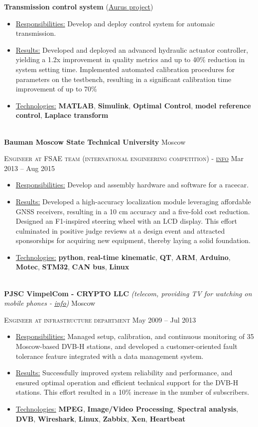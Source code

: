 \documentclass[12pt, a4paper]{extarticle}
\newcommand{\mymk}[1]{\textbf{#1}}
\newcommand{\placeheadding}[3]{\textbf{#1} \textit{#2} \hfill #3\null}
\newcommand{\positionheading}[2]{\par\noindent \textsc{#1} \hfill #2}
\newcommand{\ressubheading}[5]{\placeheadding{#1}{#2}{#3} \positionheading{#4}{#5}}
\newcommand{\horizontalline}{\par\noindent\\}
\begin{document}
\textbf{Transmission control system} (\href{https://en.wikipedia.org/wiki/Aurus_Senat}{Aurus project})
\begin{itemize}
	\item[] \underline{Responsibilities:} Develop and deploy control system for automaic transmission.
	\item[] \underline{Results:} Developed and deployed an advanced hydraulic actuator controller, yielding a 1.2x improvement in quality metrics and up to 40\% reduction in system setting time. Implemented automated calibration procedures for parameters on the testbench, resulting in a significant calibration time improvement of up to 70\%
	\item[] \underline{Technologies:} \mymk{MATLAB}, \mymk{Simulink}, \mymk{Optimal Control}, \mymk{model reference control}, \mymk{Laplace transform}
\end{itemize}
\horizontalline
% 
\ressubheading
{Bauman Moscow State Technical University}
{}
{Moscow}
{Engineer at FSAE team (international engineering competition) - \href{https://baumanracing.ru/en/}{info}}
{Mar 2013 -- Aug 2015}
\begin{itemize}
	\item[] \underline{Responsibilities:} Develop and assembly hardware and software for a racecar.
	\item[] \underline{Results:} Developed a high-accuracy localization module leveraging affordable GNSS receivers, resulting in a 10 cm accuracy and a five-fold cost reduction. Designed an F1-inspired steering wheel with an LCD display. This effort culminated in positive judge reviews at a design event and attracted sponsorships for acquiring new equipment, thereby laying a solid foundation.
	\item[] \underline{Technologies:} \mymk{python}, \mymk{real-time kinematic}, \mymk{QT}, \mymk{ARM}, \mymk{Arduino}, \mymk{Motec}, \mymk{STM32}, \mymk{CAN bus}, \mymk{Linux}

\end{itemize}
\horizontalline
% 
\ressubheading
{PJSC VimpelCom - CRYPTO LLC}
{(telecom, providing TV for watching on mobile phones - \href{https://www.dvb.org/news/russia-to-launch-dvb-h-services}{info})}
{Moscow}
{Engineer at infrastructure department}{May 2009 -- Jul 2013}
\begin{itemize}
	\item[] \underline{Responsibilities:} Managed setup, calibration, and continuous monitoring of 35 Moscow-based DVB-H stations, and developed a customer-oriented fault tolerance feature integrated with a data management system.
	\item[] \underline{Results:}  Successfully improved system reliability and performance, and ensured optimal operation and efficient technical support for the DVB-H stations. This effort resulted in a 10\% increase in the number of subscribers.
	\item[] \underline{Technologies:}  \mymk{MPEG}, \mymk{Image/Video Processing}, \mymk{Spectral analysis}, \mymk{DVB}, \mymk{Wireshark}, \mymk{Linux}, \mymk{Zabbix}, \mymk{Xen}, \mymk{Heartbeat}
\end{itemize}
%
\end{document}
